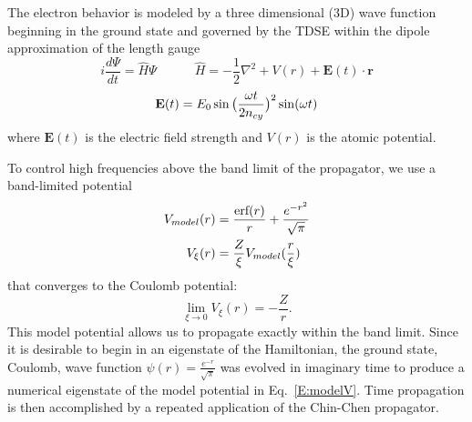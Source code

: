\documentclass[review,letterpaper]{elsarticle}
\begin{document}
\label{S:AMOmethod}
The electron behavior is modeled by a three dimensional (3D) wave function beginning in the
ground state and governed by the TDSE within the dipole approximation of the length gauge
\begin{equation}
\label{E:hamiltonian}
i\frac{d\Psi }{dt} =\hat{H}\Psi    \quad\quad\quad
\hat{H} =-\frac{1}{2}\nabla ^{2}+V(r)+\mathbf{E}(t)\cdot \mathbf{r}
\end{equation}
\begin{equation}
\mathbf{E}(t) = E_0 \sin\big(\frac{\omega t}{2 n_{cy}}\big)^2 \sin(\omega t) \notag
\end{equation}
where $\mathbf{E}(t)$ is the electric field strength and $V(r)$ is the atomic potential.

To control high frequencies above the band limit of the propagator, we use a band-limited potential
\begin{align}
V_{model}(r) &=\frac{\text{erf}(r)}{r}+\frac{e^{-r^{2}}}{\sqrt{\pi }}  \\
V_\xi(r)     &= \frac{Z}{\xi }V_{model}(\frac{r}{\xi }) \notag
\end{align}
that converges to the Coulomb potential:
\begin{equation}
\label{E:modelV}
\lim_{\xi \rightarrow 0}V_{\xi }(r) =-\frac{Z}{r}.
\end{equation}
This model potential allows us to propagate exactly within the band limit.
Since it is desirable to begin in an eigenstate of the Hamiltonian, the ground state, Coulomb, wave function
$\displaystyle{\psi(r) = \frac{e^{-r}}{\sqrt{\pi}}}$ was evolved in imaginary time to produce a
numerical eigenstate of the model potential in Eq.~\ref{E:modelV}.
Time propagation is then accomplished by a repeated application of the Chin-Chen propagator.

\label{S:convdt}
\end{document}
